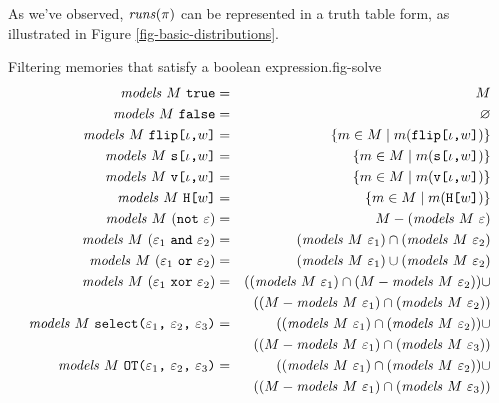 
As we've observed, $\mathit{runs}(\pi)$ can be represented in a truth table
form, as illustrated in Figure \ref{fig-basic-distributions}. 

\begin{fpfig}[t]{Filtering memories that satisfy a boolean expression.}{fig-solve}
{\small
\begin{eqnarray*}
\mathit{models}\ M\ \texttt{true} &=& M\\
\mathit{models}\ M\ \texttt{false} &=& \varnothing\\
\mathit{models}\ M\ \texttt{flip[}\iota\texttt{,}w\texttt{]} &=& \{ m \in M \mid m(\texttt{flip[}\iota\texttt{,}w\texttt{]}) \} \\
\mathit{models}\ M\ \texttt{s[}\iota\texttt{,}w\texttt{]} &=& \{ m \in M \mid m(\texttt{s[}\iota\texttt{,}w\texttt{]}) \} \\
\mathit{models}\ M\ \texttt{v[}\iota\texttt{,}w\texttt{]} &=& \{ m \in M \mid m(\texttt{v[}\iota\texttt{,}w\texttt{]}) \} \\
\mathit{models}\ M\ \texttt{H[}w\texttt{]} &=& \{ m \in M \mid m(\texttt{H[}w\texttt{]}) \} \\
\mathit{models}\ M\ (\texttt{not}\ \varepsilon) &=& M - (\mathit{models}\ M\ \varepsilon)\\
\mathit{models}\ M\ (\varepsilon_1\ \texttt{and}\ \varepsilon_2) &=& (\mathit{models}\ M\ \varepsilon_1) \cap (\mathit{models}\ M\ \varepsilon_2) \\
\mathit{models}\ M\ (\varepsilon_1\ \texttt{or}\ \varepsilon_2) &=& (\mathit{models}\ M\ \varepsilon_1) \cup (\mathit{models}\ M\ \varepsilon_2) \\
\mathit{models}\ M\ (\varepsilon_1\ \texttt{xor}\ \varepsilon_2) &=&
 ((\mathit{models}\ M\ \varepsilon_1) \cap (M - \mathit{models}\ M\ \varepsilon_2)) \cup\\
 && ((M - \mathit{models}\ M\ \varepsilon_1) \cap (\mathit{models}\ M\ \varepsilon_2)) \\
\mathit{models}\ M\ \texttt{select(} \varepsilon_1 \texttt{,}\ \varepsilon_2 \texttt{,}\ \varepsilon_3 \texttt{)} &=&
 ((\mathit{models}\ M\ \varepsilon_1) \cap (\mathit{models}\ M\ \varepsilon_2)) \cup \\
 && ((M - \mathit{models}\ M\ \varepsilon_1) \cap (\mathit{models}\ M\ \varepsilon_3)) \\
\mathit{models}\ M\ \texttt{OT(} \varepsilon_1 \texttt{,}\ \varepsilon_2 \texttt{,}\ \varepsilon_3 \texttt{)} &=&
 ((\mathit{models}\ M\ \varepsilon_1) \cap (\mathit{models}\ M\ \varepsilon_2)) \cup\\
 && ((M - \mathit{models}\ M\ \varepsilon_1) \cap (\mathit{models}\ M\ \varepsilon_3))
\end{eqnarray*}
}
\end{fpfig}

